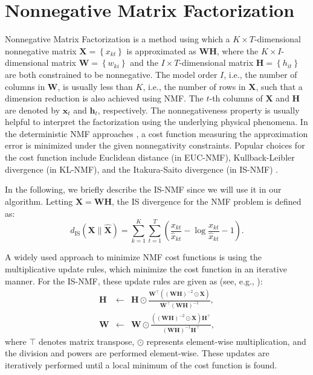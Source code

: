 \documentclass[10pt,twocolumn,twoside] {IEEEtran}
\begin{document}
\section{Nonnegative Matrix Factorization\label{sec:Nonnegative-Matrix-Factorization}}
Nonnegative Matrix Factorization is a method using which
a $K\times T$-dimensional nonnegative matrix $\mathbf{X}=\left\{ x_{kt}\right\} $ is approximated
as $\mathbf{W}\mathbf{H}$, where the $K\times I$-dimensional matrix $\mathbf{W}=\left\{ w_{ki}\right\} $
and the $I\times T$-dimensional matrix $\mathbf{H}=\left\{ h_{it}\right\} $ are both constrained
to be nonnegative. The model order $I$, i.e., the number of columns in $\mathbf{W}$,
is usually less than $K$, i.e., the number of rows in $\mathbf{X}$, such that
a dimension reduction is also achieved using NMF. The $t$-th columns of $\mathbf{X}$ and $\mathbf{H}$ are denoted by $\mathbf{x}_t$ and $\mathbf{h}_t$, respectively. The nonnegativeness
property is usually helpful to interpret the factorization using the
underlying physical phenomena. In the deterministic NMF approaches \cite{Lee2000}, a cost function measuring the approximation error is minimized under the given nonnegativity constraints.
Popular choices for the cost function include Euclidean distance
(in EUC-NMF), Kullback-Leibler divergence (in KL-NMF), and the Itakura-Saito
divergence (in IS-NMF) \cite{Lee2000,Fevotte2009}.

In the following, we briefly describe the IS-NMF since we will use it
in our algorithm. Letting $\hat{\mathbf{X}}=\mathbf{W}\mathbf{H}$, the IS
divergence for the NMF problem is defined as:
\begin{equation}
d_{\text{IS}}\left(\mathbf{X\|}\hat{\mathbf{X}}\right)=\sum_{k=1}^{K}\sum_{t=1}^{T}\left(\frac{x_{kt}}{\hat{x}_{kt}}-\log\frac{x_{kt}}{\hat{x}_{kt}}-1\right).\label{eq:IS_cost}
\end{equation}

A widely used approach to minimize NMF cost functions is using
the multiplicative update rules, which minimize the cost function in
an iterative manner. For the IS-NMF, these update rules are given
as (see, e.g., \cite{Fevotte2009}):
\begin{eqnarray}
\mathbf{H} & \leftarrow & \mathbf{H}\odot\frac{\mathbf{W}^{\top}\left(\left(\mathbf{W}\mathbf{H}\right)^{-2}\odot\mathbf{X}\right)}{\mathbf{W}^{\top}\left(\mathbf{W}\mathbf{H}\right)^{-1}},
\label{eq:updateH_IS} \\
 \mathbf{W} & \leftarrow & \mathbf{W}\odot\frac{\left(\left(\mathbf{W}\mathbf{H}\right)^{-2}\odot\mathbf{X}\right)\mathbf{H}^{\top}}{\left(\mathbf{W}\mathbf{H}\right)^{-1}\mathbf{H}^{\top}},
\label{eq:updateW_IS}
\end{eqnarray}
where $\top$ denotes matrix transpose, $\odot$ represents element-wise multiplication, and the division and powers are performed element-wise.
These updates are iteratively performed until a local minimum of the
cost function is found.
\end{document}
